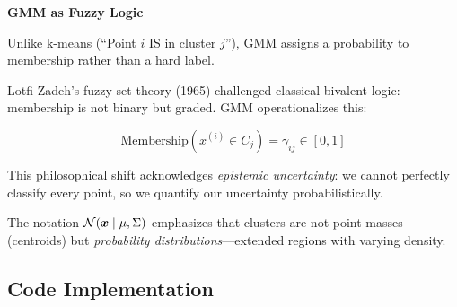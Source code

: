\begin{philobox}
\textbf{GMM as Fuzzy Logic}

Unlike k-means (``Point $i$ IS in cluster $j$''), GMM assigns a probability to membership rather than a hard label.


Lotfi Zadeh's fuzzy set theory (1965) challenged classical bivalent logic: membership is not binary but graded. GMM operationalizes this:

\begin{equation}
    \text{Membership}(x^{(i)} \in C_j) = \gamma_{ij} \in [0, 1]
\end{equation}

This philosophical shift acknowledges \textit{epistemic uncertainty}: we cannot perfectly classify every point, so we quantify our uncertainty probabilistically.

The notation $\mathcal{N}(\bm{x} \mid \mu, \Sigma)$ emphasizes that clusters are not point masses (centroids) but \textit{probability distributions}---extended regions with varying density.
\end{philobox}

\subsection{Code Implementation}

